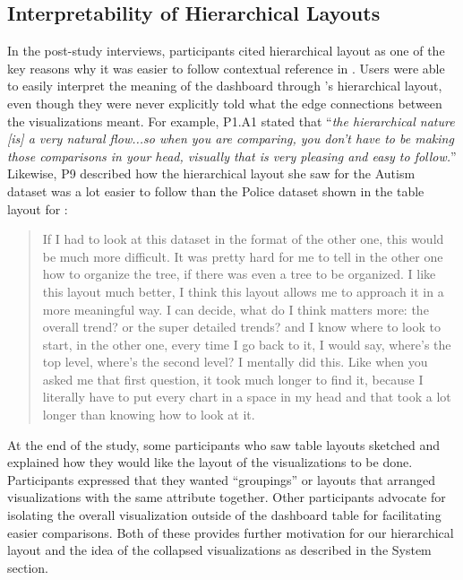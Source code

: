 \subsection{Interpretability of Hierarchical Layouts}
\par In the post-study interviews,  participants cited hierarchical layout as one of the key reasons why it was easier to follow contextual reference in \system. Users were able to easily interpret the meaning of the dashboard through \system's hierarchical layout, even though they were never explicitly told what the edge connections between the visualizations meant. For example, P1.A1 stated that ``\textit{the hierarchical nature [is] a very natural flow...so when you are comparing, you don't have to be making those comparisons in your head, visually that is very pleasing and easy to follow.}'' %
Likewise, P9 described how the hierarchical layout she saw for the Autism dataset was a lot easier to follow than the Police dataset shown in the table layout for \cluster:
\begin{quote}
If I had to look at this dataset in the format of the other one, this would be much more difficult. It was pretty hard for me to tell in the other one how to organize the tree, if there was even a tree to be organized. I like this layout much better, I think this layout allows me to approach it in a more meaningful way. I can decide, what do I think matters more: the overall trend? or the super detailed trends? and I know where to look to start, in the other one, every time I go back to it, I would say, where's the top level, where's the second level? I mentally did this. Like when you asked me that first question, it took much longer to find it, because I literally have to put every chart in a space in my head and that took a lot longer than knowing how to look at it.
\end{quote}
At the end of the study, some participants who saw table layouts sketched and explained how they would like the layout of the visualizations to be done. Participants expressed that they wanted ``groupings'' or layouts that arranged visualizations with the same attribute together. Other participants advocate for isolating the overall visualization outside of the dashboard table for facilitating easier comparisons. Both of these provides further motivation for our hierarchical layout and the idea of the collapsed visualizations as described in the System section.%
